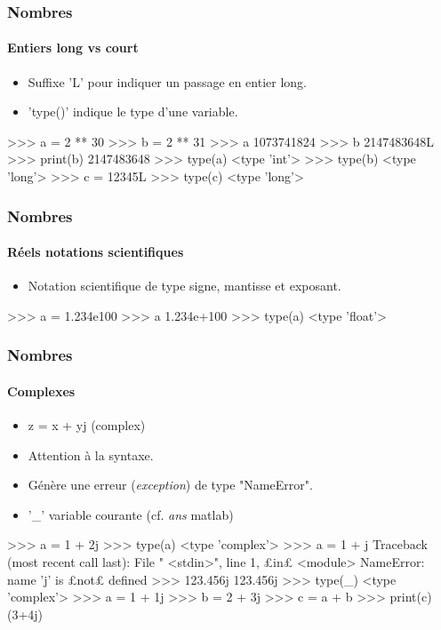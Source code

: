 \begin{frame}[fragile]
\frametitle{Nombres}
\framesubtitle{Entiers long vs court}
\begin{itemize}
 \item Suffixe 'L' pour indiquer un passage en entier long. 
 \item 'type()' indique le type d'une variable. 
\end{itemize}
\begin{pythonConsole}
>>> a = 2 ** 30
>>> b = 2 ** 31
>>> a
1073741824
>>> b
2147483648L
>>> print(b)
2147483648
>>> type(a)
<type 'int'>
>>> type(b)
<type 'long'>
>>> c = 12345L
>>> type(c)
<type 'long'>
\end{pythonConsole}
\end{frame}
\begin{frame}[fragile]
\frametitle{Nombres}
\framesubtitle{Réels notations scientifiques}
\begin{itemize}
 \item Notation scientifique de type signe, mantisse et exposant. 
\end{itemize}
\begin{pythonConsole}
>>> a = 1.234e100
>>> a
1.234e+100
>>> type(a)
<type 'float'>
\end{pythonConsole}
\end{frame}
\begin{frame}[fragile]
\frametitle{Nombres}
\framesubtitle{Complexes}
\begin{itemize}
 \item z = x + yj (complex)
 \item Attention à la syntaxe. 
 \item Génère une erreur (\emph{exception}) de type "NameError". 
 \item '\_' variable courante (cf. \emph{ans} matlab) 
\end{itemize}
\begin{pythonConsole}
>>> a = 1 + 2j
>>> type(a)
<type 'complex'>
>>> a = 1 + j
Traceback (most recent call last):
  File " <stdin>", line 1, £in£ <module>
NameError: name 'j' is £not£ defined
>>> 123.456j
123.456j
>>> type(_)
<type 'complex'>
>>> a = 1 + 1j
>>> b = 2 + 3j
>>> c = a + b
>>> print(c)
(3+4j)
\end{pythonConsole}
\end{frame}
